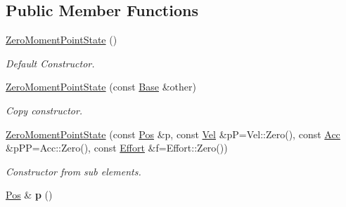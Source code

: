 \subsection*{Public Member Functions}
\begin{DoxyCompactItemize}
\item 
\hyperlink{classow__core_1_1ZeroMomentPointState_a981dce4c501475395d06dae3aa128465}{Zero\+Moment\+Point\+State} ()\hypertarget{classow__core_1_1ZeroMomentPointState_a981dce4c501475395d06dae3aa128465}{}\label{classow__core_1_1ZeroMomentPointState_a981dce4c501475395d06dae3aa128465}

\begin{DoxyCompactList}\small\item\em Default Constructor. \end{DoxyCompactList}\item 
\hyperlink{classow__core_1_1ZeroMomentPointState_a2731aa21c31e30318e33aa919d3e1f8c}{Zero\+Moment\+Point\+State} (const \hyperlink{classow__core_1_1LinearStateBase}{Base} \&other)\hypertarget{classow__core_1_1ZeroMomentPointState_a2731aa21c31e30318e33aa919d3e1f8c}{}\label{classow__core_1_1ZeroMomentPointState_a2731aa21c31e30318e33aa919d3e1f8c}

\begin{DoxyCompactList}\small\item\em Copy constructor. \end{DoxyCompactList}\item 
\hyperlink{classow__core_1_1ZeroMomentPointState_a193062feb9de69f0f9c55b7f72249368}{Zero\+Moment\+Point\+State} (const \hyperlink{classow__core_1_1ZeroMomentPoint}{Pos} \&p, const \hyperlink{classow__core_1_1ZeroMomentPointVelocity}{Vel} \&pP=Vel\+::\+Zero(), const \hyperlink{classow__core_1_1ZeroMomentPointAcceleration}{Acc} \&p\+PP=Acc\+::\+Zero(), const \hyperlink{classow__core_1_1Force}{Effort} \&f=Effort\+::\+Zero())\hypertarget{classow__core_1_1ZeroMomentPointState_a193062feb9de69f0f9c55b7f72249368}{}\label{classow__core_1_1ZeroMomentPointState_a193062feb9de69f0f9c55b7f72249368}

\begin{DoxyCompactList}\small\item\em Constructor from sub elements. \end{DoxyCompactList}\item 
\hyperlink{classow__core_1_1ZeroMomentPoint}{Pos} \& {\bfseries p} ()\hypertarget{classow__core_1_1ZeroMomentPointState_ae2a47cd6ba43c7c77b05ee20d26b260f}{}\label{classow__core_1_1ZeroMomentPointState_ae2a47cd6ba43c7c77b05ee20d26b260f}


\end{DoxyCompactItemize}
